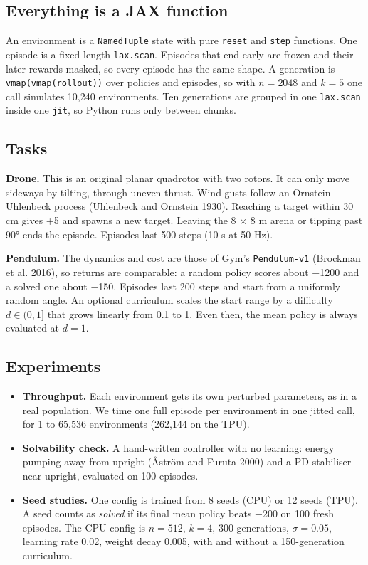 \documentclass[
]{article}
\providecommand{\tightlist}{%
  \setlength{\itemsep}{0pt}\setlength{\parskip}{0pt}}
\begin{document}
\subsection{Everything is a JAX
function}\label{everything-is-a-jax-function}

An environment is a \texttt{NamedTuple} state with pure \texttt{reset}
and \texttt{step} functions. One episode is a fixed-length
\texttt{lax.scan}. Episodes that end early are frozen and their later
rewards masked, so every episode has the same shape. A generation is
\texttt{vmap(vmap(rollout))} over policies and episodes, so with
\(n=2048\) and \(k=5\) one call simulates 10,240 environments. Ten
generations are grouped in one \texttt{lax.scan} inside one
\texttt{jit}, so Python runs only between chunks.

\subsection{Tasks}\label{tasks}

\textbf{Drone.} This is an original planar quadrotor with two rotors. It
can only move sideways by tilting, through uneven thrust. Wind gusts
follow an Ornstein--Uhlenbeck process (Uhlenbeck and Ornstein 1930).
Reaching a target within 30 cm gives +5 and spawns a new target. Leaving
the 8 × 8 m arena or tipping past 90° ends the episode. Episodes last
500 steps (10 s at 50 Hz).

\textbf{Pendulum.} The dynamics and cost are those of Gym's
\texttt{Pendulum-v1} (Brockman et al. 2016), so returns are comparable:
a random policy scores about −1200 and a solved one about −150. Episodes
last 200 steps and start from a uniformly random angle. An optional
curriculum scales the start range by a difficulty \(d\in(0,1]\) that
grows linearly from 0.1 to 1. Even then, the mean policy is always
evaluated at \(d=1\).

\subsection{Experiments}\label{experiments}

\begin{itemize}
\tightlist
\item
  \textbf{Throughput.} Each environment gets its own perturbed
  parameters, as in a real population. We time one full episode per
  environment in one jitted call, for 1 to 65,536 environments (262,144
  on the TPU).
\item
  \textbf{Solvability check.} A hand-written controller with no
  learning: energy pumping away from upright (Åström and Furuta 2000)
  and a PD stabiliser near upright, evaluated on 100 episodes.
\item
  \textbf{Seed studies.} One config is trained from 8 seeds (CPU) or 12
  seeds (TPU). A seed counts as \emph{solved} if its final mean policy
  beats −200 on 100 fresh episodes. The CPU config is \(n=512\),
  \(k=4\), 300 generations, \(\sigma=0.05\), learning rate 0.02, weight
  decay 0.005, with and without a 150-generation curriculum.
\end{itemize}
\end{document}
